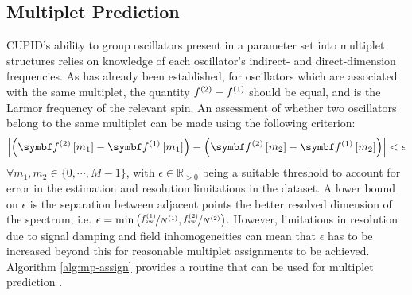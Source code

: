 \subsection{Multiplet Prediction}
\label{subsec:mp-selection}
\ac{CUPID}'s ability to group oscillators present in a parameter set into
multiplet structures relies on knowledge of each oscillator's indirect- and
direct-dimension frequencies. As has already been established, for oscillators
which are associated with the same multiplet, the quantity $f^{(2)} -
f^{(1)}$ should be equal, and is the Larmor frequency of the relevant spin.
An assessment of whether two oscillators belong to the same multiplet can be
made using the following criterion:
\begin{equation}
    \left \lvert
        \left( \bdftwo \left[ m_1 \right] -
        \bdfone \left[ m_1 \right] \right) -
        \left( \bdftwo \left[ m_2 \right] -
        \bdfone \left[ m_2 \right] \right)
    \right \rvert < \epsilon
\end{equation}
$\forall m_1, m_2 \in \lbrace 0, \cdots, M-1 \rbrace$, with  $\epsilon \in
\mathbb{R}_{>0}$ being a suitable threshold to account for error in the
estimation and resolution limitations in the dataset. A lower bound on
$\epsilon$ is the separation between adjacent points the better resolved
dimension of the spectrum, i.e. $\epsilon = \min\left(\nicefrac{f_{\mathrm{sw}}^{(1)}}{N^{(1)}},
\nicefrac{f_{\mathrm{sw}}^{(2)}}{N^{(2)}}\right)$. However, limitations in resolution due to
signal damping and field inhomogeneities can mean that $\epsilon$ has to be
increased beyond this for reasonable multiplet assignments to be achieved.
Algorithm \ref{alg:mp-assign} provides a routine that can be used for multiplet
prediction .

